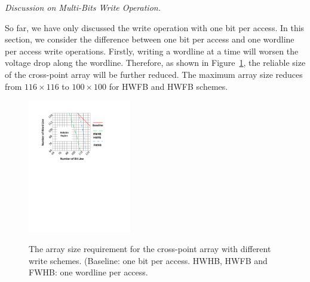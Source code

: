 \vspace{6pt} \emph{Discussion on Multi-Bits Write Operation.} \vspace{6pt}

So far, we have only discussed the write operation with one bit per access. In this section, we consider the difference between one bit per access and one wordline per access write operations. Firstly, writing a wordline at a time will worsen the voltage drop along the wordline. Therefore, as shown in Figure~\ref{fig:reliable_region}, the reliable size of the cross-point array will be further reduced. The maximum array size reduces from $116{\times}116$ to $100{\times}100$ for HWFB and HWFB schemes.


\begin{figure}%
\centering
  \includegraphics[width=0.4\textwidth]{./figures/multiwrite.pdf}\\
  \caption{The array size requirement for the cross-point array with different write schemes. (Baseline: one bit per access. HWHB, HWFB and FWHB: one wordline per access. }\label{fig:reliable_region}
    \vspace{-10pt}
\end{figure}

